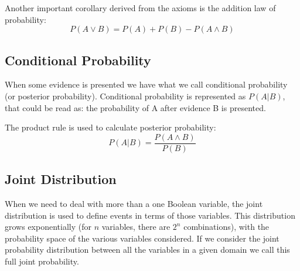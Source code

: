 Another important corollary derived from the axioms is the addition law of probability:
\begin{equation}
P(A\vee B)=P(A)+P(B) - P(A\wedge B)
\end{equation}

\subsection{Conditional Probability}
\label{subsubsec:conditionalprobability}
When some evidence is presented we have what we call conditional probability (or posterior probability). Conditional probability  is represented as $P(A|B)$, that could be read as: the probability of A after evidence B is presented. 

The product rule is used to calculate posterior probability:
\begin{equation}
\label{eq:bayesian_prababiity_product_rule}
P(A|B)=\frac{P(A\wedge B)}{P(B)}
\end{equation}


\subsection{Joint Distribution}

When we need to deal with more than a one Boolean variable, the joint distribution is used to define events in terms of those variables. 
This distribution grows exponentially (for $n$ variables, there are $2^{n}$ combinations), with the probability space of the various variables considered. If we consider the joint probability distribution between all the variables in a given domain we call this full joint probability.

